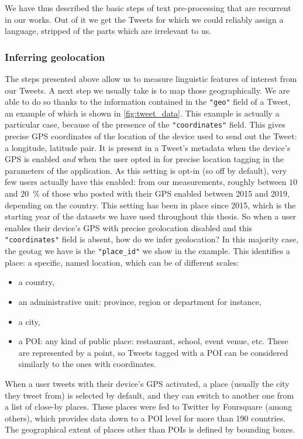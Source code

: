 \documentclass[../thesis.tex]{subfiles}
\begin{document}
We have thus described the basic steps of text pre-processing that are recurrent in our
works. Out of it we get the Tweets for which we could reliably assign a language,
stripped of the parts which are irrelevant to us.


\subsubsection{Inferring geolocation}
\label{sec:method_geoloc}
The steps presented above allow us to measure linguistic features of interest from our
Tweets. A next step we usually take is to map those geographically. We are
able to do so thanks to the information contained in the \texttt{"geo"} field of a
Tweet, an example of which is shown in \cref{fig:tweet_data}. This example is actually a
particular case, because of the presence of the \texttt{"coordinates"} field. This gives
precise GPS coordinates of the location of the device used to send out the Tweet: a
longitude, latitude pair. It is present in a Tweet's metadata when the device's GPS is
enabled \emph{and} when the user opted in for precise location tagging in the parameters
of the application. As this setting is opt-in (so off by default), very few users
actually have this enabled: from our measurements, roughly between $10$ and
\SI{20}{\percent} of those who posted with their GPS enabled between 2015 and 2019,
depending on the country. This setting has been in place since 2015, which is the
starting year of the datasets we have used throughout this thesis. So when a user
enables their device's GPS with precise geolocation disabled and this
\texttt{"coordinates"} field is absent, how do we infer geolocation? In this majority
case, the geotag we have is the \texttt{"place\_id"} we show in the example. This
identifies a place: a specific, named location, which can be of different scales:
\begin{itemize}
    \item a country,
    \item an administrative unit: province, region or department for instance,
    \item a city,
    \item a \ac{POI}: any kind of public place: restaurant, school, event venue, etc.
    These are represented by a point, so Tweets tagged with a \ac{POI} can be considered
    similarly to the ones with coordinates.
\end{itemize}
When a user tweets with their device's GPS activated, a place (usually the city they
tweet from) is selected by default, and they can switch to another one from a list of
close-by places. These places were fed to Twitter by Foursquare
\cite{FoursquarePlaces2019} (among others), which provides data down to a \ac{POI} level
for more than 190 countries. The geographical extent of places other than \acp{POI} is
defined by bounding boxes.
\end{document}
